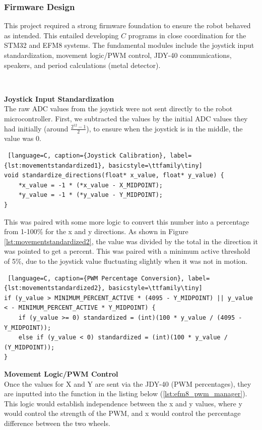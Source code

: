 \documentclass{article}
\begin{document}
\subsubsection{Firmware Design}
This project required a strong firmware foundation to ensure the robot behaved as intended. This entailed developing $C$ programs in close coordination for the STM32 and EFM8 systems.
The fundamental modules include the joystick input standardization, movement logic/PWM control, JDY-40 communications, speakers, and period calculations (metal detector).

\

\textbf{Joystick Input Standardization} \\
The raw ADC values from the joystick were not sent directly to the robot microcontroller. First, we subtracted the values by the initial ADC values they had initially (around $\frac{2^{12}-1}{2}$), to ensure when the joystick is in the middle, the value was 0.

\begin{lstlisting} [language=C, caption={Joystick Calibration}, label={lst:movementstandardized1}, basicstyle=\ttfamily\tiny]
void standardize_directions(float* x_value, float* y_value) {
    *x_value = -1 * (*x_value - X_MIDPOINT);
    *y_value = -1 * (*y_value - Y_MIDPOINT);
}
\end{lstlisting}

This was paired with some more logic to convert this number into a percentage from 1-100\% for the x and y directions. As shown in Figure \ref{lst:movementstandardized2}, the value was divided by the total in the direction it was pointed to get a percent. This was paired with a minimum
 active threshold of 5\%, due to the joystick value fluctuating slightly when it was not in motion.
\begin{lstlisting} [language=C, caption={PWM Percentage Conversion}, label={lst:movementstandardized2}, basicstyle=\ttfamily\tiny]
if (y_value > MINIMUM_PERCENT_ACTIVE * (4095 - Y_MIDPOINT) || y_value < - MINIMUM_PERCENT_ACTIVE * Y_MIDPOINT) {
    if (y_value >= 0) standardized = (int)(100 * y_value / (4095 - Y_MIDPOINT));
    else if (y_value < 0) standardized = (int)(100 * y_value / (Y_MIDPOINT));
}
\end{lstlisting}

\textbf{Movement Logic/PWM Control} \\
Once the values for X and Y are sent via the JDY-40 (PWM percentages), they are inputted into the function in the listing below (\ref{lst:efm8_pwm_manager}). This logic would establish independence between the x and y values, where y would control the strength of the PWM, and x would control the percentage difference between the two wheels.
\end{document}

